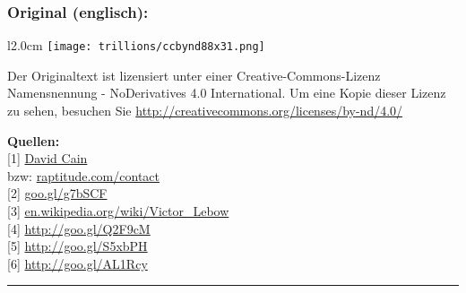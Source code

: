 \documentclass[10pt,a4paper,ngerman,twoside]{article} %
\newcommand{\SepRule}{\noindent	%
\begin{center}
\rule{250pt}{1pt} %
\end{center}
}
\begin{document}
\subsubsection*{Original (englisch):}

\begin{wrapfigure}{l}{2.0cm}
\texttt{[image: trillions/ccbynd88x31.png]}
\end{wrapfigure}
Der Originaltext ist lizensiert unter einer Creative-Commons-Lizenz Namensnennung - NoDerivatives 4.0 International. Um eine Kopie dieser Lizenz zu sehen, besuchen Sie \url{http://creativecommons.org/licenses/by-nd/4.0/}


\textbf{Quellen:} \\
{[}1{]} \href{https://twitter.com/DavidDCain}{David Cain} \\
bzw: \href{http://www.raptitude.com/contact/}{raptitude.com/contact} \\
{[}2{]} \href{http://www.raptitude.com/2011/01/how-to-make-trillions-of-dollars/}{goo.gl/g7bSCF} \\
{[}3{]} \href{https://en.wikipedia.org/wiki/Victor\_Lebow}{en.wikipedia.org/wiki/Victor\_Lebow} \\
{[}4{]} \href{http://www.raptitude.com/2010/10/being-healthy-is-not-normal/}{http://goo.gl/Q2F9cM} \\
{[}5{]} \href{http://www.raptitude.com/2011/01/i-dont-want-stuff-any-more-only-things/}{http://goo.gl/S5xbPH} \\
{[}6{]} \href{http://www.raptitude.com/2010/07/your-lifestyle-has-already-been-designed/}{http://goo.gl/AL1Rcy} 


\SepRule{}
\end{document}
